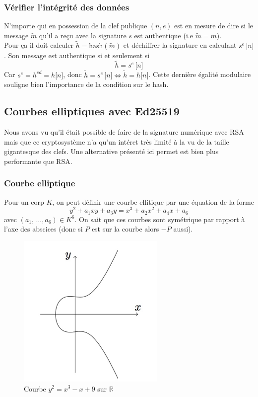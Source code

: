 \documentclass[a4paper, 12pt]{article}
\begin{document}
\subsubsection{Vérifier l'intégrité des données}
N'importe qui en possession de la clef publique $(n, e)$ est en mesure de dire si le message $\tilde{m}$ qu'il a reçu avec la signature $s$ est authentique (i.e $\tilde{m} = m$). \\
Pour ça il doit calculer $\tilde{h} = \text{hash}(\tilde{m})$ et déchiffrer la signature en calculant $s^e \, \lbrack n \rbrack$. Son message est authentique si et seulement si 
$$
\tilde{h} = s^e \, \lbrack n \rbrack
$$
Car $s^e = h^{ed} = h \lbrack n \rbrack$, donc $\tilde{h} = s^e \, \lbrack n \rbrack \Leftrightarrow \tilde{h} = h \lbrack n \rbrack$. Cette dernière égalité modulaire souligne bien l'importance de la condition sur le hash.




\subsection{Courbes elliptiques avec Ed25519}
Nous avons vu qu'il était possible de faire de la signature numérique avec RSA mais que ce cryptosystème n'a qu'un intéret très limité à la vu de la taille gigantesque des clefs. Une alternative présenté ici permet est bien plus performante que RSA.
\subsubsection{Courbe elliptique}
\noindent Pour un corp $K$, on peut définir une courbe ellitique par une équation de la forme 
$$
y^2 + a_1xy + a_3y = x^3 + a_2x^2 +a_4x + a_6
$$
avec $(a_1,\, \dots, a_6) \in K^6$. On sait que ces courbes sont symétrique par rapport à l'axe des abscices (donc si $P$ est sur la courbe alors $-P$ aussi). \\

\begin{figure}[h]
	\centering
	\includegraphics[width=.5\textwidth]{img/courbe1.png}
	\caption{Courbe $y^2 = x^3 - x + 9$ sur $\mathbb{R}$}
	\label{courbe1}
\end{figure}
\end{document}
